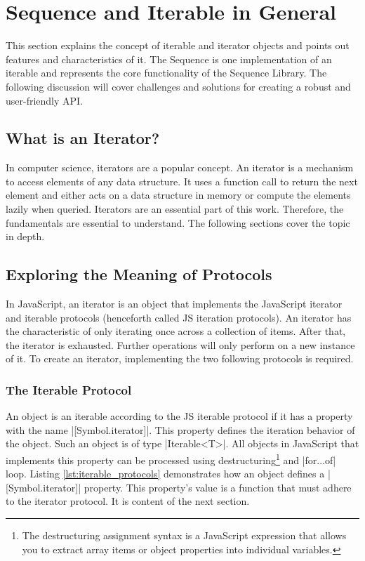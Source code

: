\section{Sequence and Iterable in General}
\label{sec:Sequence and Iterable in General}
This section explains the concept of iterable and iterator objects and points
out features and characteristics of it. The Sequence is one implementation of
an iterable and represents the core functionality of the Sequence Library. The following
discussion will cover challenges and solutions for creating a robust and
user-friendly API.

\subsection{What is an Iterator?}
\label{sub:What is an Iterator?}
In computer science, iterators are a popular concept. An iterator is a mechanism 
to access elements of any data structure. It uses a function call to return the 
next element and either acts on a data structure in memory or compute the 
elements lazily when queried. Iterators are an essential part of this work. Therefore, 
the fundamentals are essential to understand. The following sections cover
the topic in depth.

\subsection{Exploring the Meaning of Protocols}
\label{sub:Exploring the Meaning of Protocols}
In JavaScript, an iterator is an object that implements the JavaScript iterator
and iterable protocols \cite{mdn_protocols}
(henceforth called JS iteration protocols). An iterator has the characteristic 
of only iterating once across a collection of items.
After that, the iterator is exhausted. Further operations will only perform on 
a new instance of it.
\newline
To create an iterator, implementing the two following protocols is required.

\subsubsection{The Iterable Protocol}
\label{subsub:The Iterable Protocol}
An object is an iterable according to the JS iterable protocol if it has a
property with the name |[Symbol.iterator]|. This property defines the iteration
behavior of the object. Such an object is of type |Iterable<T>|.
All objects in JavaScript that implements this property can be processed using 
destructuring\footnote{The destructuring assignment syntax is a JavaScript
expression that allows you to extract array items or object properties into
individual variables.} and |for...of| loop. 
Listing \ref{lst:iterable_protocols} demonstrates how an object defines a
|[Symbol.iterator]| property.
This property's value is a function that must adhere to the iterator protocol.
It is content of the next section.

